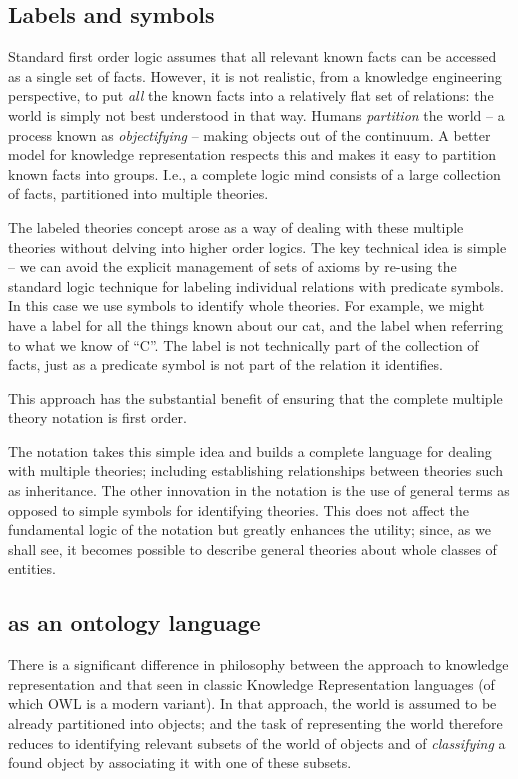 \subsection{Labels and symbols}
Standard first order logic assumes that all relevant known facts can be accessed as a single set of facts. However, it is not realistic, from a knowledge engineering perspective, to put \emph{all} the known facts into a relatively flat set of relations: the world is simply not best understood in that way. Humans \emph{partition} the world -- a process known as \emph{objectifying} -- making objects out of the continuum. A better model for knowledge representation respects this and makes it easy to partition known facts into groups. I.e., a complete logic mind consists of a large collection of facts, partitioned into multiple theories.

The labeled theories concept arose as a way of dealing with these multiple theories without delving into higher order logics. The key technical idea is simple -- we can avoid the explicit management of sets of axioms by re-using the standard logic technique for labeling individual relations with predicate symbols. In this case we use symbols to identify whole theories.  For example, we might have a  label for all the things known about our cat, and the label  when referring to what we know of ``C''. The label is not technically part of the collection of facts, just as a predicate symbol is not part of the relation it identifies.

This approach has the substantial benefit of ensuring that the complete multiple theory notation is first order.

The \LO notation takes this simple idea and builds a complete language for dealing with multiple theories; including establishing relationships between theories such as inheritance. The other innovation in the \LO notation is the use of general terms as opposed to simple symbols for identifying theories. This does not affect the fundamental logic of the notation but greatly enhances the utility; since, as we shall see, it becomes possible to describe general theories about whole classes of entities.

\subsection{\LO as an ontology language}
There is a significant difference in philosophy between the \LO approach to knowledge representation and that seen in classic Knowledge Representation languages (of which OWL\cite{owl:04} is a modern variant). In that approach, the world is assumed to be already partitioned into objects; and the task of representing the world therefore reduces to identifying relevant subsets of the world of objects and of \emph{classifying} a found object by associating it with one of these subsets.


